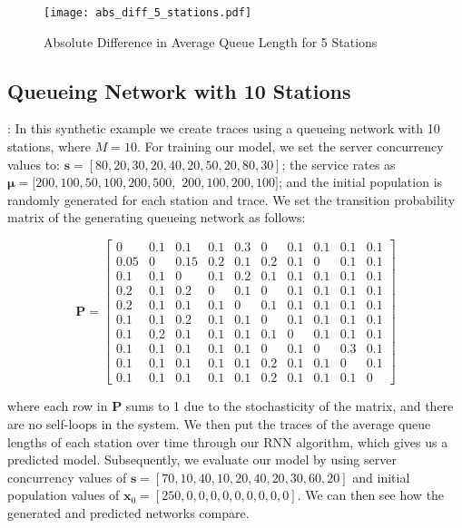 \documentclass[a4paper,11pt,titlepage]{article}
\begin{document}
\begin{figure}[h!]
\begin{center}
\texttt{[image: abs\_diff\_5\_stations.pdf]}
\caption{Absolute Difference in Average Queue Length for 5 Stations}
\label{fig:abs_diff_5_stations}
\end{center}
\end{figure}

\subsection{Queueing Network with 10 Stations}: In this synthetic example we create traces using a queueing network with 10 stations, where $M=10$. For training our model, we set the server concurrency values to: $\mathbf{s} = [80,20,30,20,40,20,50,20,80,30]$; the service rates as $\bm{\mu} = [200,100,50,100,200,500,$ $200,100,200,100]$; and the initial population is randomly generated for each station and trace. We set the transition probability matrix of the generating queueing network as follows:
        
$$\mathbf{P} = \begin{bmatrix}
0 & 0.1 & 0.1 & 0.1 & 0.3 & 0 & 0.1 & 0.1 & 0.1 & 0.1 \\
0.05 & 0 & 0.15 & 0.2 & 0.1 & 0.2 & 0.1 & 0 & 0.1 & 0.1 \\
0.1 & 0.1 & 0 & 0.1 & 0.2 & 0.1 & 0.1 & 0.1 & 0.1 & 0.1\\
0.2 & 0.1 & 0.2 & 0 & 0.1 & 0 & 0.1 & 0.1 & 0.1 & 0.1 \\
0.2 & 0.1 & 0.1 & 0.1 & 0 & 0.1 & 0.1 & 0.1 & 0.1 & 0.1 \\
0.1 & 0.1 & 0.2 & 0.1 & 0.1 & 0 & 0.1 & 0.1 & 0.1 & 0.1 \\
0.1 & 0.2 & 0.1 & 0.1 & 0.1 & 0.1 & 0 & 0.1 & 0.1 & 0.1 \\
0.1 & 0.1 & 0.1 & 0.1 & 0.1 & 0 & 0.1 & 0 & 0.3 & 0.1 \\
0.1 & 0.1 & 0.1 & 0.1 & 0.1 & 0.2 & 0.1 & 0.1 & 0 & 0.1 \\
0.1 & 0.1 & 0.1 & 0.1 & 0.1 & 0.2 & 0.1 & 0.1 & 0.1 & 0 
\end{bmatrix} $$

where each row in $\mathbf{P}$ sums to 1 due to the stochasticity of the matrix, and there are no self-loops in the system. We then put the traces of the average queue lengths of each station over time through our RNN algorithm, which gives us a predicted model. Subsequently, we evaluate our model by using server concurrency values of $\mathbf{s} = [70,10,40,10,20,40,20,30,60,20]$ and initial population values of $ \mathbf{x}_0 = [250,0,0,0,0,0,0,0,0,0]$. We can then see how the generated and predicted networks compare. \\
\end{document}
